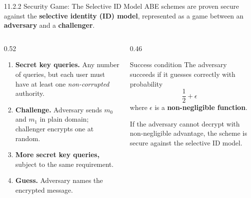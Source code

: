 \documentclass[11pt,aspectratio=169]{beamer}
\newcommand{\kw}[1]{\textbf{\color{accent}#1}}
\begin{document}
\begin{frame}{11.2.2 Security Game: The Selective ID Model}
  \small
  ABE schemes are proven secure against the \kw{selective identity (ID) model},
  represented as a game between an \kw{adversary} and a \kw{challenger}.
  \vspace{0.7em}

  \begin{columns}[T,onlytextwidth]
    \begin{column}{0.52\textwidth}
      \begin{enumerate}\scriptsize\setlength{\itemsep}{0.35em}
        \item \textbf{Secret key queries.} Any number of queries, but each user
              must have at least one \emph{non-corrupted} authority.
        \item \textbf{Challenge.} Adversary sends $m_0$ and $m_1$ in plain
              domain; challenger encrypts one at random.
        \item \textbf{More secret key queries,} subject to the same
              requirement.
        \item \textbf{Guess.} Adversary names the encrypted message.
      \end{enumerate}
    \end{column}
    \begin{column}{0.46\textwidth}
      \begin{block}{Success condition}
        \small
        The adversary succeeds if it guesses correctly with probability
        \[ \frac{1}{2} + \epsilon \]
        where $\epsilon$ is a \kw{non-negligible function}.
      \end{block}
      \vspace{0.3em}
      {\scriptsize\color{accentmid}
      If the adversary cannot decrypt with non-negligible advantage, the scheme
      is secure against the selective ID model.}
    \end{column}
  \end{columns}
\end{frame}
\end{document}
